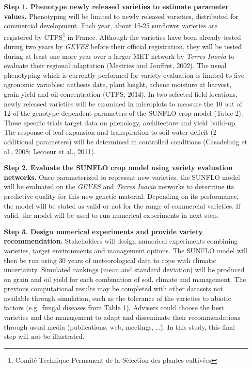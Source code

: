\documentclass[a4paper]{article}
\let\rmarkdownfootnote\footnote%
\def\footnote{\protect\rmarkdownfootnote}
\begin{document}
\textbf{Step 1. Phenotype newly released varieties to estimate parameter
values.} Phenotyping will be limited to newly released varieties,
distributed for commercial development. Each year, about 15-25 sunflower
varieties are registered by CTPS\footnote{Comité Technique Permanent de
  la Sélection des plantes cultivées} in France. Although the varieties
have been already tested during two years by \emph{GEVES} before their
official registration, they will be tested during at least one more year
over a larger MET network by \emph{Terres Inovia} to evaluate their
regional adaptation (Mestries and Jouffret, 2002). The usual phenotyping
which is currently performed for variety evaluation is limited to five
agronomic variables: anthesis date, plant height, achene moisture at
harvest, grain yield and oil concentration (CTPS, 2014). In two selected
field locations, newly released varieties will be examined in microplots
to measure the 10 out of 12 of the genotype-dependent parameters of the
SUNFLO crop model (Table 2). These specific trials target data on
phenology, architecture and yield build-up. The response of leaf
expansion and transpiration to soil water deficit (2 additional
parameters) will be determined in controlled conditions (Casadebaig et
al., 2008; Lecoeur et al., 2011).

\textbf{Step 2. Evaluate the SUNFLO crop model using variety evaluation
networks.} Once parameterized to represent new varieties, the SUNFLO
model will be evaluated on the \emph{GEVES} and \emph{Terres Inovia}
networks to determine its predictive quality for this new genetic
material. Depending on its performance, the model will be stated as
valid or not for the range of commercial varieties. If valid, the model
will be used to run numerical experiments in next step.

\textbf{Step 3. Design numerical experiments and provide variety
recommendation.} Stakeholders will design numerical experiments
combining varieties, target environments and management options. The
SUNFLO model will then be run using 30 years of meteorological data to
cope with climatic uncertainty. Simulated rankings (mean and standard
deviation) will be produced on grain and oil yield for each combination
of soil, climate and management. The previous computational results may
be completed with other datasets not available through simulation, such
as the tolerance of the varieties to abiotic factors (e.g.~fungal
diseases from Table 1). Advisers could choose the best varieties and the
management to adapt and disseminate their recommendations through usual
media (publications, web, meetings, \ldots{}). In this study, this final
step will not be illustrated.
\end{document}
